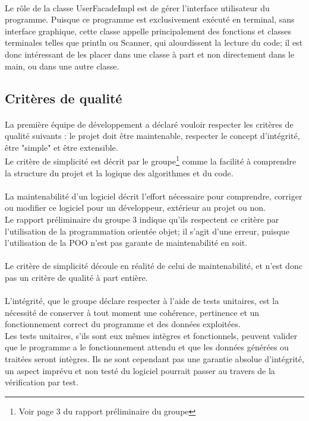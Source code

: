         \paragraph{}
        Le rôle de la classe UserFacadeImpl est de gérer l'interface utilisateur du programme. Puisque ce programme est exclusivement exécuté en terminal, sans interface graphique, cette classe appelle principalement des fonctions et classes terminales telles que println ou Scanner, qui alourdissent la lecture du code; il est donc intéressant de les placer dans une classe à part et non directement dans le main, ou dans une autre classe. 
        
\subsection{Critères de qualité}
    \paragraph{}
    La première équipe de développement a déclaré vouloir respecter les critères de qualité suivants : le projet doit être maintenable, respecter le concept d'intégrité, être "simple" et être extensible.\\ Le critère de simplicité est décrit par le groupe\footnote{Voir page 3 du rapport préliminaire du groupe} comme la facilité à comprendre la structure du projet et la logique des algorithmes et du code. 
    \paragraph{}
    La maintenabilité d'un logiciel décrit l'effort nécessaire pour comprendre, corriger ou modifier ce logiciel pour un développeur, extérieur au projet ou non. \\
    Le rapport préliminaire du groupe 3 indique qu'ils respectent ce critère par l'utilisation de la programmation orientée objet; il s'agit d'une erreur, puisque l'utilisation de la POO n'est pas garante de maintenabilité en soit.
    \paragraph{}
    Le critère de simplicité découle en réalité de celui de maintenabilité, et n'est donc pas un critère de qualité à part entière.  
    \paragraph{}
    L'intégrité, que le groupe déclare respecter à l'aide de tests unitaires, est la nécessité de conserver à tout moment une cohérence, pertinence et un fonctionnement correct du programme et des données exploitées.\\
    Les tests unitaires, s'ils sont eux mêmes intègres et  fonctionnels, peuvent valider que le programme a le fonctionnement attendu et que les données générées ou  traitées seront intègres. Ils ne sont cependant pas une garantie absolue d'intégrité, un aspect imprévu et non testé du logiciel pourrait passer au travers de la vérification par test.  
